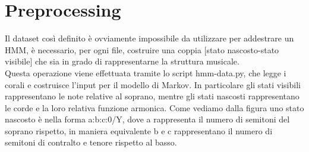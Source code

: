 \section{Preprocessing}
Il dataset così definito è ovviamente impossibile da utilizzare per addestrare un HMM, è necessario, per ogni file, costruire una coppia [stato nascosto-stato visibile] che sia in grado di rappresentarne la struttura musicale. \\
Questa operazione viene effettuata tramite lo script hmm-data.py, che legge i corali e costruisce l'input per il modello di Markov.
In particolare gli stati visibili rappresentano le note relative al soprano, mentre gli stati nascosti rappresentano le corde e la loro relativa funzione armonica.
Come vediamo dalla figura uno stato nascosto è nella forma a:b:c:0/Y, dove a rappresenta il numero di semitoni del soprano rispetto, in maniera equivalente b e c rappresentano il numero di semitoni di contralto e tenore rispetto al basso.

